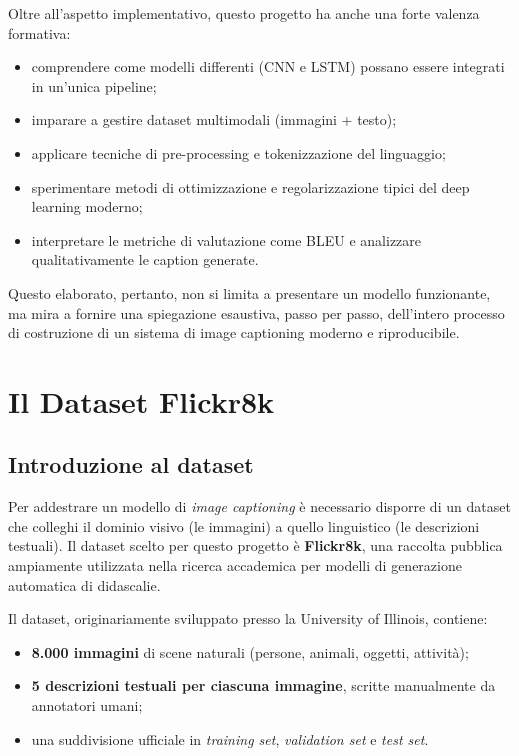 \documentclass[11pt,a4paper]{report}
\begin{document}
Oltre all’aspetto implementativo, questo progetto ha anche una forte valenza formativa:
\begin{itemize}
  \item comprendere come modelli differenti (CNN e LSTM) possano essere integrati in un’unica pipeline;
  \item imparare a gestire dataset multimodali (immagini + testo);
  \item applicare tecniche di pre-processing e tokenizzazione del linguaggio;
  \item sperimentare metodi di ottimizzazione e regolarizzazione tipici del deep learning moderno;
  \item interpretare le metriche di valutazione come BLEU e analizzare qualitativamente le caption generate.
\end{itemize}

Questo elaborato, pertanto, non si limita a presentare un modello funzionante, ma mira a fornire una spiegazione esaustiva, passo per passo, dell’intero processo di costruzione di un sistema di image captioning moderno e riproducibile.


\chapter{Il Dataset Flickr8k}

\section{Introduzione al dataset}

Per addestrare un modello di \emph{image captioning} è necessario disporre di un dataset che colleghi il dominio visivo (le immagini) a quello linguistico (le descrizioni testuali).  
Il dataset scelto per questo progetto è \textbf{Flickr8k}, una raccolta pubblica ampiamente utilizzata nella ricerca accademica per modelli di generazione automatica di didascalie.

Il dataset, originariamente sviluppato presso la University of Illinois, contiene:
\begin{itemize}
  \item \textbf{8.000 immagini} di scene naturali (persone, animali, oggetti, attività);
  \item \textbf{5 descrizioni testuali per ciascuna immagine}, scritte manualmente da annotatori umani;
  \item una suddivisione ufficiale in \emph{training set}, \emph{validation set} e \emph{test set}.
\end{itemize}
\end{document}

